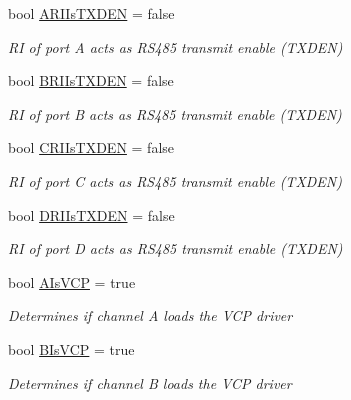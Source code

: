 \begin{DoxyCompactItemize}
bool \mbox{\hyperlink{class_f_t_d2_x_x___n_e_t_1_1_f_t_d_i_1_1_f_t4232_h___e_e_p_r_o_m___s_t_r_u_c_t_u_r_e_afc973708e5373cde6969b55783666bd1}{A\+R\+I\+Is\+T\+X\+D\+EN}} = false
\begin{DoxyCompactList}\small\item\em RI of port A acts as R\+S485 transmit enable (T\+X\+D\+EN) \end{DoxyCompactList}\item 
bool \mbox{\hyperlink{class_f_t_d2_x_x___n_e_t_1_1_f_t_d_i_1_1_f_t4232_h___e_e_p_r_o_m___s_t_r_u_c_t_u_r_e_afd2fa3c212e8efb74e186cebfac1d86e}{B\+R\+I\+Is\+T\+X\+D\+EN}} = false
\begin{DoxyCompactList}\small\item\em RI of port B acts as R\+S485 transmit enable (T\+X\+D\+EN) \end{DoxyCompactList}\item 
bool \mbox{\hyperlink{class_f_t_d2_x_x___n_e_t_1_1_f_t_d_i_1_1_f_t4232_h___e_e_p_r_o_m___s_t_r_u_c_t_u_r_e_af2c174f60a1cff97177c29241dba214f}{C\+R\+I\+Is\+T\+X\+D\+EN}} = false
\begin{DoxyCompactList}\small\item\em RI of port C acts as R\+S485 transmit enable (T\+X\+D\+EN) \end{DoxyCompactList}\item 
bool \mbox{\hyperlink{class_f_t_d2_x_x___n_e_t_1_1_f_t_d_i_1_1_f_t4232_h___e_e_p_r_o_m___s_t_r_u_c_t_u_r_e_a8764e1f5be0460cbadf001c7e7f909be}{D\+R\+I\+Is\+T\+X\+D\+EN}} = false
\begin{DoxyCompactList}\small\item\em RI of port D acts as R\+S485 transmit enable (T\+X\+D\+EN) \end{DoxyCompactList}\item 
bool \mbox{\hyperlink{class_f_t_d2_x_x___n_e_t_1_1_f_t_d_i_1_1_f_t4232_h___e_e_p_r_o_m___s_t_r_u_c_t_u_r_e_a1aa7f63fcfde5ab56bdb4c888a561a01}{A\+Is\+V\+CP}} = true
\begin{DoxyCompactList}\small\item\em Determines if channel A loads the V\+CP driver \end{DoxyCompactList}\item 
bool \mbox{\hyperlink{class_f_t_d2_x_x___n_e_t_1_1_f_t_d_i_1_1_f_t4232_h___e_e_p_r_o_m___s_t_r_u_c_t_u_r_e_a6c4305dc2323ab98816816961b8942c4}{B\+Is\+V\+CP}} = true
\begin{DoxyCompactList}\small\item\em Determines if channel B loads the V\+CP driver \end{DoxyCompactList}\item 

\end{DoxyCompactItemize}
